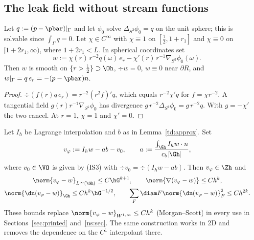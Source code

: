 \subsection{The leak field without stream functions}

\begin{lemma}\label{td:w}
Let $q:=(p-\pbar)|_\Gamma$ and let $\phi_0$ solve $\Delta_{S^2}\phi_0=q$ on the unit sphere; this is solvable since $\int_\Gamma q=0$. Let $\chi\in C^\infty$ with $\chi\equiv1$ on $[\tfrac12,1+r_1]$ and $\chi\equiv0$ on $[1+2r_1,\infty)$, where $1+2r_1<L$. In spherical coordinates set
\[
w:=\chi(r)\,r^{-2}q(\omega)\,e_r-\chi'(r)\,r^{-1}\nabla_{S^2}\phi_0(\omega).
\]
Then $w$ is smooth on $\{r>\tfrac12\}\supset\Oh$, $\div w=0$, $w\equiv0$ near $\partial R$, and $w|_\Gamma=q\,e_r=-(p-\pbar)n$.
\end{lemma}

\begin{proof}
$\div(f(r)q\,e_r)=r^{-2}(r^2f)'q$, which equals $r^{-2}\chi'q$ for $f=\chi r^{-2}$. A tangential field $g(r)r^{-1}\nabla_{S^2}\phi_0$ has divergence $g\,r^{-2}\Delta_{S^2}\phi_0=g\,r^{-2}q$. With $g=-\chi'$ the two cancel. At $r=1$, $\chi=1$ and $\chi'=0$.
\end{proof}

\begin{lemma}\label{td:vphi}
Let $I_h$ be Lagrange interpolation and $b$ as in Lemma~\ref{td:approx}. Set
\[
v_\varphi:=I_hw-ab-v_0,\qquad a:=\frac{\int_{\Gh}I_hw\cdot n}{c_b|\Gh|},
\]
where $v_0\in\VO$ is given by (IS3) with $\div v_0=\div(I_hw-ab)$. Then $v_\varphi\in\Zh$ and
\begin{gather*}
\norm{v_\varphi-w}_{L^\infty(\Gh)}\le C\hG^{k+1},\qquad \norm{\nabla(v_\varphi-w)}\le Ch^k,\\
\norm{\dn(v_\varphi-w)}_{\Gh}\le Ch^k\hG^{-1/2},\qquad \sum_F\diam F\norm{\dn(v_\varphi-w)}^2_F\le Ch^{2k}.
\end{gather*}
These bounds replace $\norm{v_\varphi-w}_{W^{1,\infty}}\le Ch^k$ (Morgan--Scott) in every use in Sections~\ref{sec:printed} and~\ref{ns:sec}. The same construction works in 2D and removes the dependence on the $C^1$ interpolant there.
\end{lemma}

